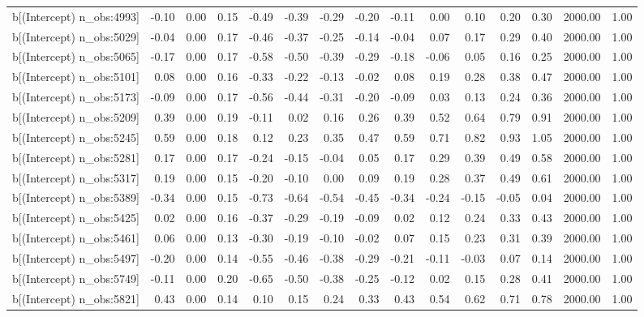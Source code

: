 \begin{table}[ht]
\begin{tabular}{rrrrrrrrrrrrrrr}
  b[(Intercept) n\_obs:4993] & -0.10 & 0.00 & 0.15 & -0.49 & -0.39 & -0.29 & -0.20 & -0.11 & 0.00 & 0.10 & 0.20 & 0.30 & 2000.00 & 1.00 \\ 
  b[(Intercept) n\_obs:5029] & -0.04 & 0.00 & 0.17 & -0.46 & -0.37 & -0.25 & -0.14 & -0.04 & 0.07 & 0.17 & 0.29 & 0.40 & 2000.00 & 1.00 \\ 
  b[(Intercept) n\_obs:5065] & -0.17 & 0.00 & 0.17 & -0.58 & -0.50 & -0.39 & -0.29 & -0.18 & -0.06 & 0.05 & 0.16 & 0.25 & 2000.00 & 1.00 \\ 
  b[(Intercept) n\_obs:5101] & 0.08 & 0.00 & 0.16 & -0.33 & -0.22 & -0.13 & -0.02 & 0.08 & 0.19 & 0.28 & 0.38 & 0.47 & 2000.00 & 1.00 \\ 
  b[(Intercept) n\_obs:5173] & -0.09 & 0.00 & 0.17 & -0.56 & -0.44 & -0.31 & -0.20 & -0.09 & 0.03 & 0.13 & 0.24 & 0.36 & 2000.00 & 1.00 \\ 
  b[(Intercept) n\_obs:5209] & 0.39 & 0.00 & 0.19 & -0.11 & 0.02 & 0.16 & 0.26 & 0.39 & 0.52 & 0.64 & 0.79 & 0.91 & 2000.00 & 1.00 \\ 
  b[(Intercept) n\_obs:5245] & 0.59 & 0.00 & 0.18 & 0.12 & 0.23 & 0.35 & 0.47 & 0.59 & 0.71 & 0.82 & 0.93 & 1.05 & 2000.00 & 1.00 \\ 
  b[(Intercept) n\_obs:5281] & 0.17 & 0.00 & 0.17 & -0.24 & -0.15 & -0.04 & 0.05 & 0.17 & 0.29 & 0.39 & 0.49 & 0.58 & 2000.00 & 1.00 \\ 
  b[(Intercept) n\_obs:5317] & 0.19 & 0.00 & 0.15 & -0.20 & -0.10 & 0.00 & 0.09 & 0.19 & 0.28 & 0.37 & 0.49 & 0.61 & 2000.00 & 1.00 \\ 
  b[(Intercept) n\_obs:5389] & -0.34 & 0.00 & 0.15 & -0.73 & -0.64 & -0.54 & -0.45 & -0.34 & -0.24 & -0.15 & -0.05 & 0.04 & 2000.00 & 1.00 \\ 
  b[(Intercept) n\_obs:5425] & 0.02 & 0.00 & 0.16 & -0.37 & -0.29 & -0.19 & -0.09 & 0.02 & 0.12 & 0.24 & 0.33 & 0.43 & 2000.00 & 1.00 \\ 
  b[(Intercept) n\_obs:5461] & 0.06 & 0.00 & 0.13 & -0.30 & -0.19 & -0.10 & -0.02 & 0.07 & 0.15 & 0.23 & 0.31 & 0.39 & 2000.00 & 1.00 \\ 
  b[(Intercept) n\_obs:5497] & -0.20 & 0.00 & 0.14 & -0.55 & -0.46 & -0.38 & -0.29 & -0.21 & -0.11 & -0.03 & 0.07 & 0.14 & 2000.00 & 1.00 \\ 
  b[(Intercept) n\_obs:5749] & -0.11 & 0.00 & 0.20 & -0.65 & -0.50 & -0.38 & -0.25 & -0.12 & 0.02 & 0.15 & 0.28 & 0.41 & 2000.00 & 1.00 \\ 
  b[(Intercept) n\_obs:5821] & 0.43 & 0.00 & 0.14 & 0.10 & 0.15 & 0.24 & 0.33 & 0.43 & 0.54 & 0.62 & 0.71 & 0.78 & 2000.00 & 1.00 \\ 

\end{tabular}
\end{table}
